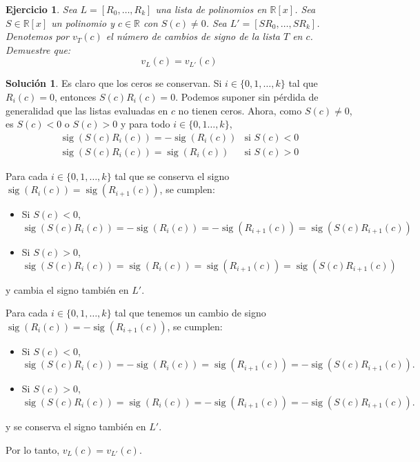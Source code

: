 \documentclass[10pt]{article}
\newtheorem{ejer}{Ejercicio}
\theoremstyle{definition}
\newtheorem*{sol}{Solución}
\newcommand{\RR}{\mathbb{R}}
\newcommand{\RRx}{\mathbb{R}[x]}
\newcommand{\sig}{\operatorname{sig}}
\begin{document}
\begin{ejer} Sea $L=[R_0,\ldots,R_k]$ una lista de polinomios en $\RRx$. Sea $S\in\RRx$ un polinomio y $c\in\RR$ con $S(c)\neq 0$. Sea $L'=[SR_0,\ldots, SR_k]$. Denotemos por $v_T(c)$ el número de cambios de signo de la lista $T$ en $c$. Demuestre que:
$$v_L(c)=v_{L'}(c)$$
\end{ejer}
\begin{sol} Es claro que los ceros se conservan. Si $i\in\{0,1,\ldots, k\}$ tal que $R_i(c)=0$, entonces $S(c)R_i(c)=0$. Podemos suponer sin pérdida de generalidad que las listas evaluadas en $c$ no tienen ceros. Ahora, como $S(c)\neq 0$, es $S(c)<0$ o $S(c)>0$ y para todo $i\in\{0,1\ldots,k\}$,
\[\begin{array}{ll}
    \sig(S(c)R_i(c))=-\sig(R_i(c)) & \text{si } S(c)<0 \\
    \sig(S(c)R_i(c))=\sig(R_i(c)) & \text{si } S(c)>0
\end{array}\]

Para cada $i\in\{0,1,\ldots, k\}$ tal que se conserva el signo $\sig(R_{i}(c))=\sig(R_{i+1}(c))$, se cumplen:
\begin{itemize}
    \item Si $S(c)<0$, \[\sig(S(c)R_i(c))=-\sig(R_i(c))=-\sig(R_{i+1}(c))=\sig(S(c)R_{i+1}(c))\]
    \item Si $S(c)>0$, \[\sig(S(c)R_i(c))=\sig(R_i(c))=\sig(R_{i+1}(c))=\sig(S(c)R_{i+1}(c))\]
\end{itemize}
y cambia el signo también en $L'$.

Para cada $i\in\{0,1,\ldots, k\}$ tal que tenemos un cambio de signo $\sig(R_i(c))=-\sig(R_{i+1}(c))$, se cumplen:
\begin{itemize}
    \item Si $S(c)<0$, \[\sig(S(c)R_i(c))=-\sig(R_i(c))=\sig(R_{i+1}(c))=-\sig(S(c)R_{i+1}(c)).\]
    \item Si $S(c)>0$, \[\sig(S(c)R_i(c))=\sig(R_i(c))=-\sig(R_{i+1}(c))=-\sig(S(c)R_{i+1}(c)).\]
\end{itemize}
y se conserva el signo también en $L'$.

Por lo tanto, $v_L(c)=v_{L'}(c)$.
\end{sol}
\end{document}
